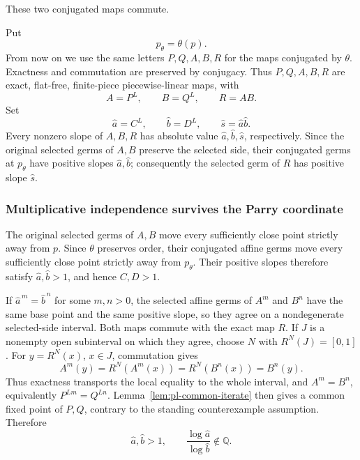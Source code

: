 \documentclass[11pt]{article}
\theoremstyle{definition}
\theoremstyle{remark}
\newcommand{\I}{[0,1]}
\begin{document}
These two conjugated maps commute.

Put
\[
 p_\theta=\theta(p).
\]
From now on we use the same letters \(P,Q,A,B,R\) for the maps conjugated by
\(\theta\).  Exactness and commutation are preserved by conjugacy.  Thus
\(P,Q,A,B,R\) are exact, flat-free, finite-piece piecewise-linear maps, with
\[
 A=P^L,\qquad B=Q^L,\qquad R=AB.
\]
Set
\begin{equation}\label{term:eq:transformed-scales}
 \widehat a=C^L,\qquad
 \widehat b=D^L,\qquad
 \widehat s=\widehat a\widehat b.
\end{equation}
Every nonzero slope of \(A,B,R\) has absolute value
\(\widehat a,\widehat b,\widehat s\), respectively.  Since the original
selected germs of \(A,B\) preserve the selected side, their conjugated germs
at \(p_\theta\) have positive slopes \(\widehat a,\widehat b\); consequently
the selected germ of \(R\) has positive slope \(\widehat s\).

\subsubsection{Multiplicative independence survives the Parry coordinate}

The original selected germs of \(A,B\) move every sufficiently close point
strictly away from \(p\).  Since \(\theta\) preserves order, their conjugated
affine germs move every sufficiently close point strictly away from
\(p_\theta\).  Their positive slopes therefore satisfy
\(\widehat a,\widehat b>1\), and hence \(C,D>1\).

If \(\widehat a^{\,m}=\widehat b^{\,n}\) for some \(m,n>0\), the selected
affine germs of \(A^m\) and \(B^n\) have the same base point and the same
positive slope, so they agree on a nondegenerate selected-side interval.
Both maps commute with the exact map \(R\).  If \(J\) is a nonempty open
subinterval on which they agree, choose \(N\) with \(R^N(J)=\I\).  For
\(y=R^N(x)\), \(x\in J\), commutation gives
\[
 A^m(y)=R^N(A^m(x))=R^N(B^n(x))=B^n(y).
\]
Thus exactness transports the local equality to the whole interval, and
\(A^m=B^n\), equivalently
\(P^{Lm}=Q^{Ln}\).  Lemma~\ref{lem:pl-common-iterate} then gives a
common fixed point of \(P,Q\), contrary to the standing counterexample
assumption.  Therefore
\begin{equation}\label{term:eq:new-independent}
 \widehat a,\widehat b>1,\qquad
 \frac{\log\widehat a}{\log\widehat b}\notin\mathbb Q.
\end{equation}
\end{document}
